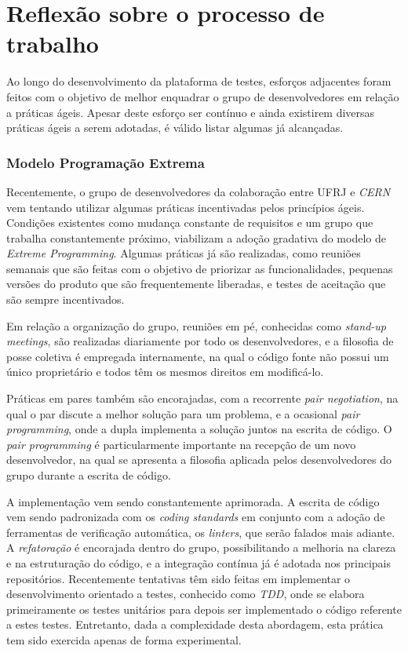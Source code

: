 \hypertarget{implementacao-de-praticas-ageis}{%
\section{Reflexão sobre o processo de trabalho}\label{implementacao-de-praticas-ageis}}

Ao longo do desenvolvimento da plataforma de testes, esforços adjacentes foram feitos com o objetivo de melhor enquadrar o grupo de desenvolvedores em relação a práticas ágeis. Apesar deste esforço ser contínuo e ainda existirem diversas práticas ágeis a serem adotadas, é válido listar algumas já alcançadas.

\hypertarget{modelo-extreme-programming}{%
\label{modelo-extreme-programming}}
\subsubsection{Modelo Programação Extrema}

Recentemente, o grupo de desenvolvedores da colaboração entre UFRJ e \emph{CERN} vem tentando utilizar algumas práticas incentivadas pelos princípios ágeis. Condições existentes como mudança constante de requisitos e um grupo que trabalha constantemente próximo, viabilizam a adoção gradativa do modelo de \emph{Extreme Programming}. Algumas práticas já são realizadas, como reuniões semanais que são feitas com o objetivo de priorizar as funcionalidades, pequenas versões do produto que são frequentemente liberadas, e testes de aceitação que são sempre incentivados.

Em relação a organização do grupo, reuniões em pé, conhecidas como \emph{stand-up meetings}, são realizadas diariamente por todo os desenvolvedores, e a filosofia de posse coletiva é empregada internamente, na qual o código fonte não possui um único proprietário e todos têm os mesmos direitos em modificá-lo.

Práticas em pares também são encorajadas, com a recorrente \emph{pair negotiation}, na qual o par discute a melhor solução para um problema, e a ocasional \emph{pair programming}, onde a dupla implementa a solução juntos na escrita de código. O \emph{pair programming} é particularmente importante na recepção de um novo desenvolvedor, na qual se apresenta a filosofia aplicada pelos desenvolvedores do grupo durante a escrita de código.

A implementação vem sendo constantemente aprimorada. A escrita de código vem sendo padronizada com os \emph{coding standards} em conjunto com a adoção de ferramentas de verificação automática, os \emph{linters}, que serão falados mais adiante. A \emph{refatoração} é encorajada dentro do grupo, possibilitando a melhoria na clareza e na estruturação do código, e a integração contínua já é adotada nos principais repositórios. Recentemente tentativas têm sido feitas em implementar o desenvolvimento orientado a testes, conhecido como \emph{TDD}, onde se elabora primeiramente os testes unitários para depois ser implementado o código referente a estes testes. Entretanto, dada a complexidade desta abordagem, esta prática tem sido exercida apenas de forma experimental.

